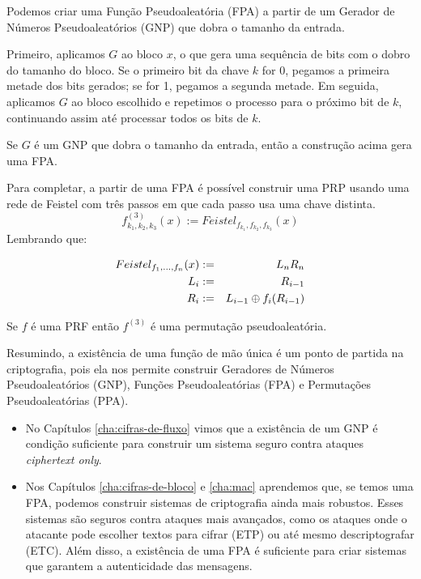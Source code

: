 Podemos criar uma Função Pseudoaleatória (FPA) a partir de um Gerador de Números Pseudoaleatórios (GNP) que dobra o tamanho da entrada.

Primeiro, aplicamos $G$ ao bloco $x$, o que gera uma sequência de bits com o dobro do tamanho do bloco.
Se o primeiro bit da chave $k$ for 0, pegamos a primeira metade dos bits gerados; se for 1, pegamos a segunda metade.
Em seguida, aplicamos $G$ ao bloco escolhido e repetimos o processo para o próximo bit de $k$, continuando assim até processar todos os bits de $k$.

\begin{theorem}[Yao]
  Se $G$ é um GNP que dobra o tamanho da entrada, então a construção acima gera uma FPA.
\end{theorem}

Para completar, a partir de uma FPA é possível construir uma PRP usando uma rede de Feistel com três passos em que cada passo usa uma chave distinta.
\begin{displaymath}
  f_{k_1,k_2,k_3}^{(3)}(x) := Feistel_{f_{k_1},f_{k_2},f_{k_3}}(x)
\end{displaymath}
Lembrando que:

\begin{eqnarray*}
  Feistel_{f_1,\dots,f_n}(x) & := & L_nR_n\\
  L_i & := & R_{i-1}\\
  R_i & := & L_{i-1} \oplus f_i(R_{i-1})
\end{eqnarray*}


\begin{theorem}
  Se $f$ é uma PRF então $f^{(3)}$ é uma permutação pseudoaleatória.
\end{theorem}

Resumindo, a existência de uma função de mão única é um ponto de partida na criptografia, pois ela nos permite construir Geradores de Números Pseudoaleatórios (GNP), Funções Pseudoaleatórias (FPA) e Permutações Pseudoaleatórias (PPA).
\begin{itemize}
\item No Capítulos \ref{cha:cifras-de-fluxo} vimos que a existência de um GNP é condição suficiente para construir um sistema seguro contra ataques {\em ciphertext only}.
\item Nos Capítulos \ref{cha:cifras-de-bloco} e \ref{cha:mac} aprendemos que, se temos uma FPA, podemos construir sistemas de criptografia ainda mais robustos. Esses sistemas são seguros contra ataques mais avançados, como os ataques onde o atacante pode escolher textos para cifrar (ETP) ou até mesmo descriptografar (ETC).
  Além disso, a existência de uma FPA é suficiente para criar sistemas que garantem a autenticidade das mensagens.
\end{itemize}

